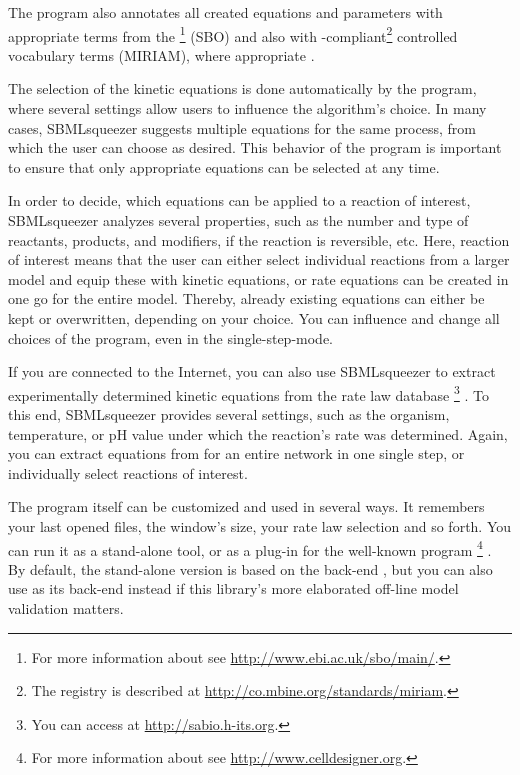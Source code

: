 The program also annotates all created equations and parameters with appropriate
terms from the \SBO\footnote{For more information about \SBO see \url{http://www.ebi.ac.uk/sbo/main/}.}
(\acl{SBO}) and also
with \MIRIAM-compliant\footnote{The \MIRIAM registry is described at \url{http://co.mbine.org/standards/miriam}.}
controlled vocabulary terms (\acl{MIRIAM}), where appropriate \citep{Le2005, Novere2006b, Laible2007, Courtot2011}.

The selection of the kinetic equations is done automatically by the program,
where several settings allow users to influence the algorithm's choice.
In many cases, SBMLsqueezer suggests multiple equations for the same process,
from which the user can choose as desired.
This behavior of the program is important to ensure that only appropriate
equations can be selected at any time.

In order to decide, which equations can be applied to a reaction of interest,
SBMLsqueezer analyzes several properties, such as the number and type of
reactants, products, and modifiers, if the reaction is reversible, etc.
Here, reaction of interest means that the user can either select individual
reactions from a larger model and equip these with kinetic equations, or rate
equations can be created in one go for the entire model.
Thereby, already existing equations can either be kept or overwritten, depending
on your choice.
You can influence and change all choices of the program, even in the single-step-mode.

If you are connected to the Internet, you can also use SBMLsqueezer to extract
experimentally determined kinetic equations from the rate law database
\SABIO\footnote{You can access \SABIO at \url{http://sabio.h-its.org}.}
\citep{Wittig2006, Rojas2007, Krebs2007, Wittig2012}.
To this end, SBMLsqueezer provides several settings, such as the organism,
temperature, or pH value under which the reaction's rate was determined. Again,
you can extract equations from \SABIO for an entire network in one single step, or
individually select reactions of interest.

The program itself can be customized and used in several ways. It remembers your
last opened files, the window's size, your rate law selection and so forth.
You can run it as a stand-alone tool, or as a plug-in for the well-known program
\CellDesigner\footnote{For more information about \CellDesigner see \url{http://www.celldesigner.org}.}
\citep{Funahashi2003, Funahashi2006, Funahashi2007a, Funahashi2008}.
By default, the stand-alone version is based on the \JSBML back-end 
\citep{Draeger2011b, Rodriguez2015}, but you can also use \libSBML \citep{Bornstein2008} as its
\SBML back-end instead if this library's more elaborated off-line model validation
matters.

